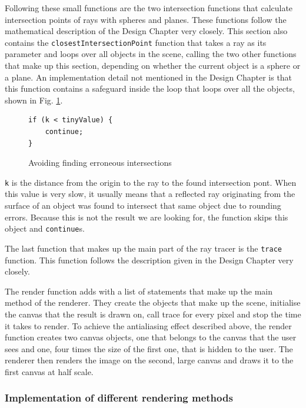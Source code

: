 \documentclass[11pt]{report}
\begin{document}
Following these small functions are the two intersection functions that calculate intersection points of rays with spheres and planes. These functions follow the mathematical description of the Design Chapter very closely. This section also contains the \texttt{closestIntersectionPoint} function that takes a ray as its parameter and loops over all objects in the scene, calling the two other functions that make up this section, depending on whether the current object is a sphere or a plane. An implementation detail not mentioned in the Design Chapter is that this function contains a safeguard inside the loop that loops over all the objects, shown in Fig. \ref{irenderer1}.

\begin{figure}[ht]
\begin{lstlisting}
if (k < tinyValue) {
    continue;
}
\end{lstlisting}
\caption{Avoiding finding erroneous intersections}
\label{irenderer1}
\end{figure}

\texttt{k} is the distance from the origin to the ray to the found intersection pont. When this value is very slow, it usually means that a reflected ray originating from the surface of an object was found to intersect that same object due to rounding errors. Because this is not the result we are looking for, the function skips this object and \texttt{continue}s.

The last function that makes up the main part of the ray tracer is the \texttt{trace} function. This function follows the description given in the Design Chapter very closely.

The render function adds with a list of statements that make up the main method of the renderer. They create the objects that make up the scene, initialise the canvas that the result is drawn on, call trace for every pixel and stop the time it takes to render. To achieve the antialiasing effect described above, the render function creates two canvas objects, one that belongs to the canvas that the user sees and one, four times the size of the first one, that is hidden to the user. The renderer then renders the image on the second, large canvas and draws it to the first canvas at half scale. 

\subsubsection{Implementation of different rendering methods}
\end{document}
